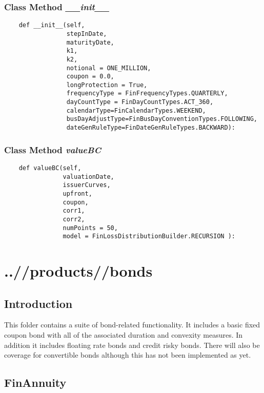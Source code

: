 \documentclass[twoside,11pt]{book}
\begin{document}
\subsection{Class Method {\it \_\_init\_\_}}


\begin{lstlisting}
    def __init__(self, 
                 stepInDate,
                 maturityDate, 
                 k1, 
                 k2, 
                 notional = ONE_MILLION, 
                 coupon = 0.0, 
                 longProtection = True,
                 frequencyType = FinFrequencyTypes.QUARTERLY,
                 dayCountType = FinDayCountTypes.ACT_360,
                 calendarType=FinCalendarTypes.WEEKEND,
                 busDayAdjustType=FinBusDayConventionTypes.FOLLOWING,
                 dateGenRuleType=FinDateGenRuleTypes.BACKWARD):
\end{lstlisting}

\subsection{Class Method {\it valueBC}}


\begin{lstlisting}
    def valueBC(self, 
                valuationDate,
                issuerCurves,
                upfront,
                coupon,
                corr1,
                corr2,
                numPoints = 50,
                model = FinLossDistributionBuilder.RECURSION ):
\end{lstlisting}


\chapter{..//products//bonds}
\section{Introduction}
This folder contains a suite of bond-related functionality. It includes a basic fixed coupon bond with all of the associated duration and convexity measures. In addition it includes floating rate bonds and credit risky bonds. There will also be coverage for convertible bonds although this has not been implemented as yet.

\newpage
\section{FinAnnuity}
\end{document}
